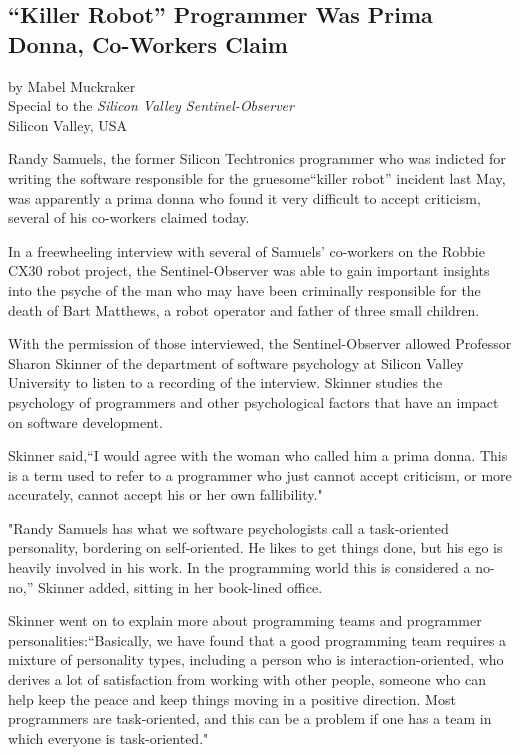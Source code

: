 \begin{center}
\section*{``Killer Robot'' Programmer Was Prima Donna, Co-Workers Claim}
by Mabel Muckraker\\
Special to the \textit{Silicon Valley Sentinel-Observer}\\
Silicon Valley, USA
\end{center}
Randy Samuels, the former Silicon Techtronics programmer who was indicted for writing the software responsible for the gruesome``killer robot'' incident last May, was apparently a prima donna who found it very difficult to accept criticism, several of his co-workers claimed today.

In a freewheeling interview with several of Samuels' co-workers on the Robbie CX30 robot project, the Sentinel-Observer was able to gain important insights into the psyche of the man who may have been criminally responsible for the death of Bart Matthews, a robot operator and father of three small children.

With the permission of those interviewed, the Sentinel-Observer allowed Professor Sharon Skinner of the department of software psychology at Silicon Valley University to listen to a recording of the interview. Skinner studies the psychology of programmers and other psychological factors that have an impact on software development.

Skinner said,``I would agree with the woman who called him a prima donna. This is a term used to refer to a programmer who just cannot accept criticism, or more accurately, cannot accept his or her own fallibility."

"Randy Samuels has what we software psychologists call a task-oriented personality, bordering on self-oriented. He likes to get things done, but his ego is heavily involved in his work. In the programming world this is considered a no-no,'' Skinner added, sitting in her book-lined office.

Skinner went on to explain more about programming teams and programmer personalities:``Basically, we have found that a good programming team requires a mixture of personality types, including a person who is interaction-oriented, who derives a lot of satisfaction from working with other people, someone who can help keep the peace and keep things moving in a positive direction. Most programmers are task-oriented, and this can be a problem if one has a team in which everyone is task-oriented."

